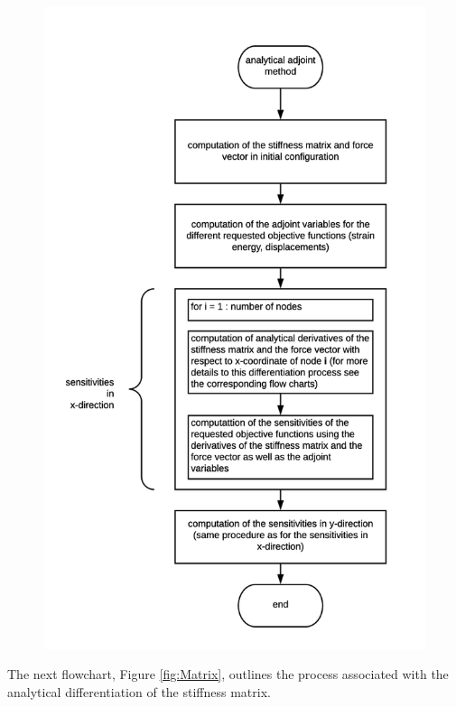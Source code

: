 \begin{figure}[ht]
\begin{minipage}{.5\textwidth}
  \label{fig:Numerical}
\end{minipage}%
\begin{minipage}{.5\textwidth}
  \centering
  \includegraphics[width=1.07\linewidth]{images/analyticaladjoint.png}
  \label{fig:Analytical}
\end{minipage}
\end{figure}
The next flowchart, Figure \ref{fig:Matrix}, outlines the process associated with the analytical differentiation of the stiffness matrix.\\[3pt]

